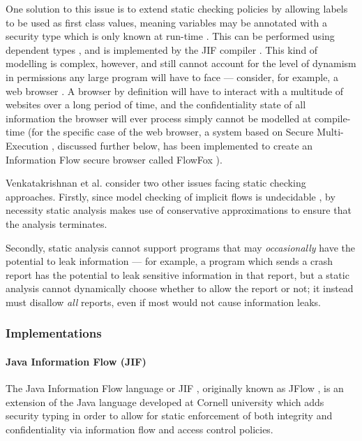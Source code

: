 One solution to this issue is to extend static checking policies by allowing labels to be used as first class values, meaning variables may be annotated with a security type which is only known at run-time \cite{myers1997if}. This can be performed using dependent types \cite{xi1999dependenttypes}, and is implemented by the JIF compiler \cite{myers1999jif}. This kind of modelling is complex, however, and still cannot account for the level of dynamism in permissions any large program will have to face --- consider, for example, a web browser \cite{venkatakrishnan2006runtime}. A browser by definition will have to interact with a multitude of websites over a long period of time, and the confidentiality state of all information the browser will ever process simply cannot be modelled at compile-time (for the specific case of the web browser, a system based on Secure Multi-Execution \cite{devriese2010sme}, discussed further below, has been implemented to create an Information Flow secure browser called FlowFox \cite{degroef2012flowfox}).

Venkatakrishnan et al. \cite{venkatakrishnan2006runtime} consider two other issues facing static checking approaches. Firstly, since model checking of implicit flows is undecidable \cite{landi1992undecidability}, by necessity static analysis makes use of conservative approximations to ensure that the analysis terminates.

Secondly, static analysis cannot support programs that may \textit{occasionally} have the potential to leak information \cite{venkatakrishnan2006runtime} --- for example, a program which sends a crash report has the potential to leak sensitive information in that report, but a static analysis cannot dynamically choose whether to allow the report or not; it instead must disallow \textit{all} reports, even if most would not cause information leaks.

\subsubsection{Implementations}

\paragraph{Java Information Flow (JIF)}

The Java Information Flow language or JIF \cite{myers2006jif}, originally known as JFlow \cite{myers1999jif}, is an extension of the Java language developed at Cornell university which adds security typing in order to allow for static enforcement of both integrity and confidentiality via information flow and access control policies.

